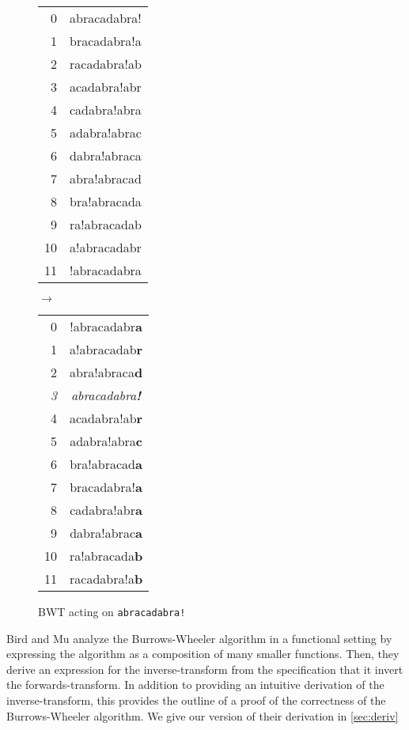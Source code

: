 \documentclass[11pt]{article}
\begin{document}
\begin{figure}
  \centering
  \begin{tabular}{rc}
    0  & abracadabra! \\
    1  & bracadabra!a \\
    2  & racadabra!ab \\
    3  & acadabra!abr \\
    4  & cadabra!abra \\
    5  & adabra!abrac \\
    6  & dabra!abraca \\
    7  & abra!abracad \\
    8  & bra!abracada \\
    9  & ra!abracadab \\
    10 & a!abracadabr \\
    11 & !abracadabra
  \end{tabular}
  $\rightarrow$
  \begin{tabular}{rc}
    0  & !abracadabr\textbf{a} \\
    1  & a!abracadab\textbf{r} \\
    2  & abra!abraca\textbf{d} \\
    \textit{3} & \textit{abracadabra\textbf{!}} \\
    4  & acadabra!ab\textbf{r} \\
    5  & adabra!abra\textbf{c} \\
    6  & bra!abracad\textbf{a} \\
    7  & bracadabra!\textbf{a} \\
    8  & cadabra!abr\textbf{a} \\
    9  & dabra!abrac\textbf{a} \\
    10 & ra!abracada\textbf{b} \\
    11 & racadabra!a\textbf{b}
  \end{tabular}
  \caption{BWT acting on \texttt{abracadabra!}}
  \label{fig:bw_ex}
\end{figure}

Bird and Mu \cite{birdmu,pearls} analyze the Burrows-Wheeler algorithm
in a functional setting by expressing the algorithm as a composition
of many smaller functions. Then, they derive an expression for the
inverse-transform from the specification that it invert the
forwards-transform. In addition to providing an intuitive derivation
of the inverse-transform, this provides the outline of a proof of the
correctness of the Burrows-Wheeler algorithm. We give our version of
their derivation in \autoref{sec:deriv}
\end{document}
